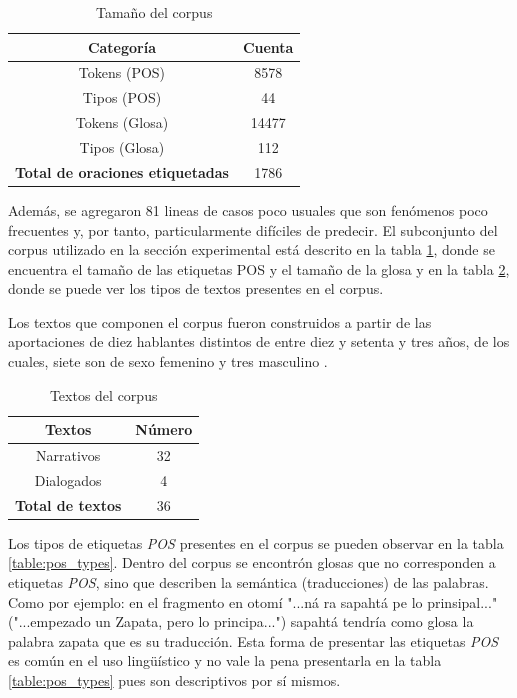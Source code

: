 \documentclass[letterpaper,12pt,oneside]{book}
\theoremstyle{definition}
\begin{document}

\begin{table}
	\centering
	\begin{tabular}{c | c}
		\textbf{Categoría} & \textbf{Cuenta} \\ \hline
		Tokens (POS) & 8578\\
		Tipos (POS) & 44\\
		Tokens (Glosa) & 14477\\
		Tipos (Glosa) & 112\\
		\textbf{Total de oraciones etiquetadas} & 1786 \\ 
	\end{tabular}
	\caption{Tamaño del corpus}
	\label{table:corpus_length:1}
\end{table}

Además, se agregaron 81 lineas de casos poco usuales que son fenómenos poco frecuentes y, por tanto, particularmente difíciles de predecir. El subconjunto del corpus utilizado en la sección experimental está descrito en la tabla \ref{table:corpus_length:1}, donde se encuentra el tamaño de las etiquetas POS y el tamaño de la glosa y en la tabla \ref{table:corpus_text:1}, donde se puede ver los tipos de textos presentes en el corpus.

Los textos que componen el corpus fueron construidos a partir de las aportaciones de diez hablantes distintos de entre diez y setenta y tres años, de los cuales, siete son de sexo femenino y tres masculino \citep{lastra1992otomi}.

\begin{table}
	\centering
	\begin{tabular}{ c | c }
		\textbf{Textos} & \textbf{Número} \\ \hline
		Narrativos & 32 \\
		Dialogados & 4  \\
		\textbf{Total de textos}  & 36 \\
	\end{tabular}
	\caption{Textos del corpus}
	\label{table:corpus_text:1}
\end{table}

Los tipos de etiquetas \textit{POS} presentes en el corpus se pueden observar en la tabla \ref{table:pos_types}. Dentro del corpus se encontrón glosas que no corresponden a etiquetas \textit{POS}, sino que describen la semántica (traducciones) de las palabras. Como por ejemplo: en el fragmento en otomí \textsf{"...ná ra sapahtá pe lo prinsipal..."} ("...empezado un Zapata, pero lo principa...") \textsf{sapahtá} tendría como glosa la palabra \textsf{zapata} que es su traducción. Esta forma de presentar las etiquetas \textit{POS} es común en el uso lingüístico y no vale la pena presentarla en la tabla \ref{table:pos_types} pues son descriptivos por sí mismos. 
\end{document}
